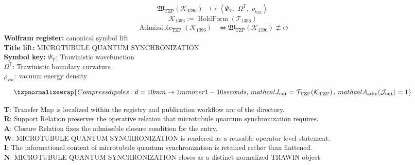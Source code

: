 \noindent
\begin{minipage}[t]{0.48\linewidth}
\begingroup
\small
\[
\begin{aligned}
\mathfrak{W}_{\mathrm{TZP}}\!\left(\mathcal{K}_{1396}\right)
&\longmapsto
\left\langle \Psi_{\mathrm{T}},\; \Omega^{\mathbb{T}},\; \rho_{\mathrm{vac}} \right\rangle
\end{aligned}
\]
\[
\mathcal{K}_{1396}
:=
\operatorname{HoldForm}\!\left(\mathcal{T}_{1396}\right)
\]
\[
\begin{aligned}
\operatorname{Admissible}_{\mathrm{TZP}}\!\left(\mathcal{K}_{1396}\right)
&\Longleftrightarrow
\mathfrak{W}_{\mathrm{TZP}}\!\left(\mathcal{K}_{1396}\right)\not\equiv\varnothing
\end{aligned}
\]
\textbf{Wolfram register:} canonical symbol lift\\
\textbf{Title lift:} MICROTUBULE QUANTUM SYNCHRONIZATION\\
\textbf{Symbol key:} \(\Psi_{\mathrm{T}}\): Trawinistic wavefunction\\ \(\Omega^{\mathbb{T}}\): Trawinistic boundary curvature\\ \(\rho_{\mathrm{vac}}\): vacuum energy density
\par
\endgroup
\end{minipage}\hfill
\begin{minipage}[t]{0.48\linewidth}
\[
\tzpnormalizewrap{Compress dipoles: d = 10 mm \to 1 mm over 1-10 seconds,\,mathcal{J}_{\mathrm{out}} = \mathcal{T}_{\mathrm{TZP}}\!\left(\mathcal{K}_{\mathrm{TZP}}\right),\,mathcal{A}_{\mathrm{adm}}\!\left(\mathcal{J}_{\mathrm{out}}\right)=1}
\]

\small
\textbf{T}: Transfer Map is localized within the registry and publication workflow arc of the directory.\\
\textbf{R}: Support Relation preserves the operative relation that microtubule quantum synchronization requires.\\
\textbf{A}: Closure Relation fixes the admissible closure condition for the entry.\\
\textbf{W}: MICROTUBULE QUANTUM SYNCHRONIZATION is rendered as a reusable operator-level statement.\\
\textbf{I}: The informational content of microtubule quantum synchronization is retained rather than flattened.\\
\textbf{N}: MICROTUBULE QUANTUM SYNCHRONIZATION closes as a distinct normalized TRAWIN object.
\normalsize
\end{minipage}

